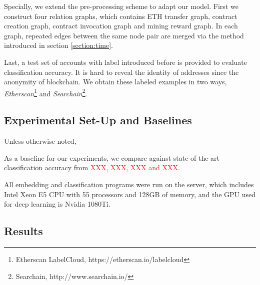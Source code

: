 Specially, we extend the pre-processing scheme to adapt our model. First we construct four relation graphs, which contains ETH transfer graph, contract creation graph, contract invocation graph and mining reward graph. In each graph, repeated edges between the same node pair are merged via the method introduced in section \ref{section:time}.

Last, a test set of accounts with label introduced before is provided to evaluate classification accuracy. It is hard to reveal the identity of addresses since the anonymity of blockchain. We obtain these labeled examples in two ways, \emph{Etherscan}\footnote{Etherscan LabelCloud, https://etherscan.io/labelcloud} and \emph{Searchain}\footnote{Searchain, http://www.searchain.io/}.




\subsection{Experimental Set-Up and Baselines}
Unless otherwise noted,

As a baseline for our experiments, we compare against state-of-the-art classification accuracy from \textcolor{red}{XXX, XXX, XXX and XXX}.

All embedding and classification programs were run on the server, which includes Intel Xeon E5 CPU with 55 processors and 128GB of memory, and the GPU used for deep learning is Nvidia 1080Ti.

\subsection{Results}



